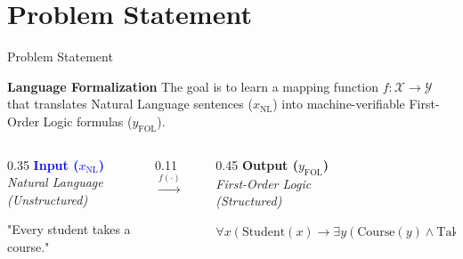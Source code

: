 \documentclass[10pt, aspectratio=169]{beamer}
\begin{document}
\section{Problem Statement}

\begin{frame}{Problem Statement}

    \begin{block}{\textbf{Language Formalization}}
        The goal is to learn a mapping function $f: \mathcal{X} \rightarrow \mathcal{Y}$ that translates Natural Language sentences ($x_\text{NL}$) into machine-verifiable First-Order Logic formulas ($y_\text{FOL}$).
    \end{block}
    \pause
    \vspace{0.5cm}

    \begin{columns}[c]

        \begin{column}{0.35\textwidth}
            \centering
            \textbf{\textcolor{blue}{Input ($x_\text{NL}$)}} \\
            \vspace{0.1cm}
            \scriptsize{\textit{Natural Language}} \\
            \scriptsize{\textit{(Unstructured)}}
            \begin{alertblock}{}
                \centering
                \small
                "Every student takes a course."
            \end{alertblock}
        \end{column}

        \begin{column}{0.11\textwidth}
            \vspace{0.4cm}
            \Huge $\xrightarrow{f(\cdot)}$
        \end{column}

        \begin{column}{0.45\textwidth}
            \centering
            \textbf{\textcolor{green!40!black}{Output ($y_\text{FOL}$)}} \\
            \vspace{0.1cm}
            \scriptsize{\textit{First-Order Logic}} \\
            \scriptsize{\textit{(Structured)}}
            \begin{exampleblock}{}
                \centering
                \footnotesize
                $\forall x (\text{Student}(x) \rightarrow \exists y (\text{Course}(y) \wedge \text{Takes}(x, y)))$
            \end{exampleblock}
        \end{column}


\end{columns}
\end{frame}
\end{document}
